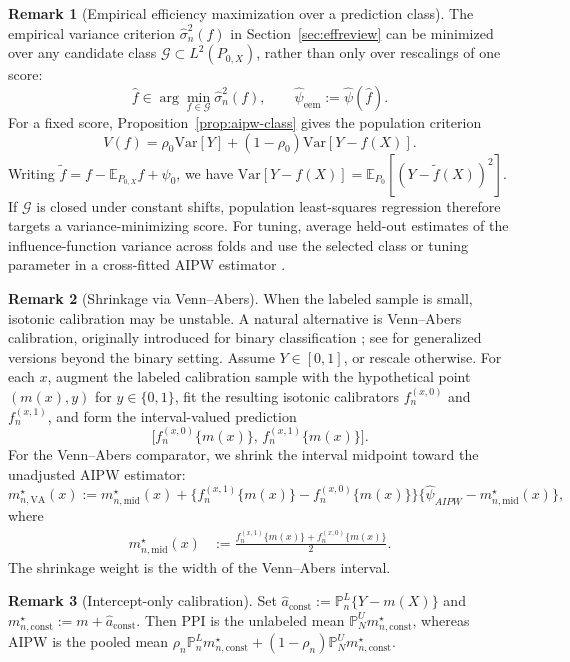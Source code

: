 \documentclass{article}
\theoremstyle{plain}
\theoremstyle{definition}
\newtheorem{remark}{Remark}
\newcommand{\E}{\mathbb{E}}
\newcommand{\Var}{\mathrm{Var}}
\newcommand{\1}{\mathbbm{1}}
\newcommand{\mhat}{m}
\newcommand{\rhozero}{\rho_0}
\newcommand{\rhon}{\rho_n}
\newcommand{\Pl}{\mathbb{P}^{L}_n}
\newcommand{\Pu}{\mathbb{P}^{U}_N}
\newcommand{\Px}{P_{0,X}}
\begin{document}
\begin{remark}[Empirical efficiency maximization over a prediction class]
The empirical variance criterion \(\widehat\sigma_n^2(f)\) in
Section~\ref{sec:effreview} can be minimized over any candidate class
\(\mathcal G\subset L^2(\Px)\), rather than only over rescalings of one score:
\[
\hat f\in\arg\min_{f\in\mathcal G}\widehat\sigma_n^2(f),
\qquad
\widehat\psi_{\mathrm{eem}}:=\widehat\psi(\hat f).
\]
For a fixed score, Proposition~\ref{prop:aipw-class} gives the population criterion
\[
V(f)=\rhozero\Var[Y]+(1-\rhozero)\Var[Y-f(X)].
\]
Writing \(\tilde f=f-\E_{\Px}f+\psi_0\), we have
\(\Var[Y-f(X)]=\E_{P_0}[(Y-\tilde f(X))^2]\).
If \(\mathcal G\) is closed under constant shifts, population least-squares
regression therefore targets a variance-minimizing score.
For tuning, average held-out estimates of the influence-function variance
across folds and use the selected class or tuning parameter in a cross-fitted
AIPW estimator \citep{rubin2008empirical}.
\end{remark}

\begin{remark}[Shrinkage via Venn--Abers]
When the labeled sample is small, isotonic calibration may be unstable. A natural alternative is Venn--Abers calibration, originally introduced for binary classification \citep{vovk2012venn}; see \cite{van2024self, van2025venn} for generalized versions beyond the binary setting. Assume \(Y \in [0,1]\), or rescale otherwise. For each \(x\), augment the labeled calibration sample with the hypothetical point \((\mhat(x),y)\) for \(y \in \{0,1\}\), fit the resulting isotonic calibrators \(f_n^{(x,0)}\) and \(f_n^{(x,1)}\), and form the interval-valued prediction
\[
\bigl[f_n^{(x,0)}\{\mhat(x)\},\, f_n^{(x,1)}\{\mhat(x)\}\bigr].
\]
For the Venn--Abers comparator, we shrink the interval midpoint toward the unadjusted AIPW estimator:
\[
m_{n,\mathrm{VA}}^\star(x)
:=
m_{n,\mathrm{mid}}^\star(x)
+
\bigl\{f_n^{(x,1)}\{\mhat(x)\}-f_n^{(x,0)}\{\mhat(x)\}\bigr\}
\bigl\{\widehat\psi_{AIPW}-m_{n,\mathrm{mid}}^\star(x)\bigr\},
\]
where
\[
\begin{aligned}
m_{n,\mathrm{mid}}^\star(x)
&:=
\frac{f_n^{(x,1)}\{\mhat(x)\}+f_n^{(x,0)}\{\mhat(x)\}}{2}.
\end{aligned}
\]
The shrinkage weight is the width of the Venn--Abers interval.
\end{remark}

\begin{remark}[Intercept-only calibration]
Set \(\hat a_{\mathrm{const}}:=\Pl\{Y-\mhat(X)\}\) and
\(m_{n,\mathrm{const}}^\star:=\mhat+\hat a_{\mathrm{const}}\).
Then PPI is the unlabeled mean \(\Pu m_{n,\mathrm{const}}^\star\),
whereas AIPW is the pooled mean
\(\rhon\Pl m_{n,\mathrm{const}}^\star+(1-\rhon)\Pu m_{n,\mathrm{const}}^\star\).
\end{remark}
\end{document}
